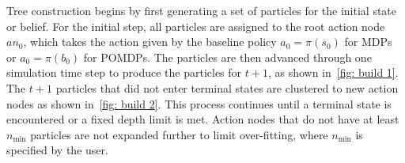 \documentclass[letterpaper]{article} %
\begin{document}
Tree construction begins by first generating a set of particles for the initial state or belief.
For the initial step, all particles are assigned to the root action node $an_0$, which takes the action given by the baseline policy $a_0 = \pi(s_0)$ for MDPs or $a_0 = \pi(b_0)$ for POMDPs.
The particles are then advanced through one simulation time step to produce the particles for $t+1$, as shown in~\cref{fig: build 1}.
The $t+1$ particles that did not enter terminal states are clustered to new action nodes as shown in~\cref{fig: build 2}.
This process continues until a terminal state is encountered or a fixed depth limit is met.
Action nodes that do not have at least $n_{\min}$ particles are not expanded further to limit over-fitting, where $n_{\min}$ is specified by the user.
\end{document}
